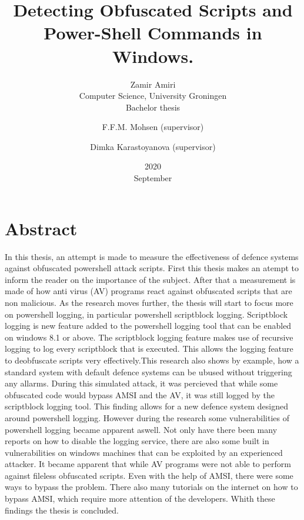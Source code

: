 \documentclass{article}%
\title{Detecting Obfuscated Scripts and Power-Shell Commands in Windows.}
\date{2020\\ September}
\author{Zamir Amiri\\ Computer Science, University Groningen 
\\Bachelor thesis
\and F.F.M. Mohsen (supervisor)
\and Dimka Karastoyanova (supervisor)
}
\begin{document}
\maketitle
\section*{Abstract}
In this thesis, an attempt is made to measure the effectiveness of defence systems against obfuscated powershell attack scripts. First this thesis makes an atempt to inform the reader on the importance of the subject. After that a measurement is made of how anti virus (AV) programs react against obfuscated scripts that are non malicious. As the research moves further, the thesis will start to focus more on powershell logging, in particular powershell scriptblock logging. Scriptblock logging is new feature added to the powershell logging tool that can be enabled on windows 8.1 or above. The scriptblock logging feature makes use of recursive logging to log every scriptblock that is executed. This allows the logging feature to deobfuscate scripts very effectively.This research also shows by example, how a standard system with default defence systems can be ubused without triggering any allarms. During this simulated attack, it was percieved that while some obfuscated code would bypass AMSI and the AV, it was still logged by the scriptblock logging tool. This finding allows for a new defence system designed around powershell logging. However during the research some vulnerabilities of powershell logging became apparent aswell. Not only have there been many reports on how to disable the logging service, there are also some built in vulnerabilities on windows machines that can be exploited by an experienced attacker. It became apparent that while AV programs were not able to perform against fileless obfuscated scripts. Even with the help of AMSI, there were some ways to bypass the problem. There also many tutorials on the internet on how to bypass AMSI, which require more attention of the developers. Whith these findings the thesis is concluded.
\newpage
\tableofcontents
\newpage
\end{document}
